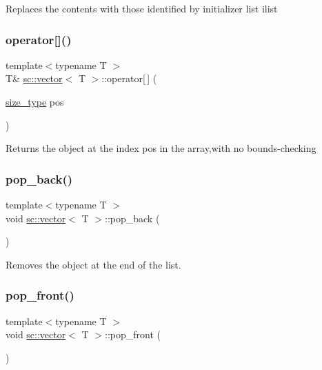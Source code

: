 Replaces the contents with those identified by initializer list ilist \mbox{\label{classsc_1_1vector_ab93846461528695f38e1d143231b0653}} 
\subsubsection{\texorpdfstring{operator[]()}{operator[]()}}
{\footnotesize\ttfamily template$<$typename T $>$ \\
T\& \hyperlink{classsc_1_1vector}{sc\+::vector}$<$ T $>$\+::operator\mbox{[}$\,$\mbox{]} (\begin{DoxyParamCaption}\item[{\hyperlink{classsc_1_1vector_a48bf37ba1a6d0c13504414d86e27c399}{size\+\_\+type}}]{pos }\end{DoxyParamCaption})\hspace{0.3cm}{\ttfamily [inline]}}

Returns the object at the index pos in the array,with no bounds-\/checking \mbox{\label{classsc_1_1vector_a3dbc8155ac3737f9a9ffe7f454a8f321}} 
\subsubsection{\texorpdfstring{pop\+\_\+back()}{pop\_back()}}
{\footnotesize\ttfamily template$<$typename T $>$ \\
void \hyperlink{classsc_1_1vector}{sc\+::vector}$<$ T $>$\+::pop\+\_\+back (\begin{DoxyParamCaption}{ }\end{DoxyParamCaption})\hspace{0.3cm}{\ttfamily [inline]}}

Removes the object at the end of the list. \mbox{\label{classsc_1_1vector_aad4717b5827454557f7c9e5c3edd5a7e}} 
\subsubsection{\texorpdfstring{pop\+\_\+front()}{pop\_front()}}
{\footnotesize\ttfamily template$<$typename T $>$ \\
void \hyperlink{classsc_1_1vector}{sc\+::vector}$<$ T $>$\+::pop\+\_\+front (\begin{DoxyParamCaption}{ }\end{DoxyParamCaption})\hspace{0.3cm}{\ttfamily [inline]}}

